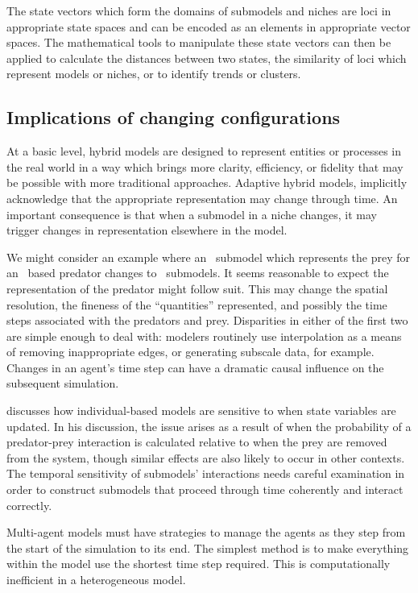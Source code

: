 The state vectors which form the domains of sub\-models and niches are
loci in appropriate state spaces and can be encoded as an elements in
appropriate vector spaces. The math\-e\-mat\-i\-cal tools to manipulate these
state vectors can then be applied to calculate the distances between
two states, the similarity of loci which represent models or niches,
or to identify trends or clusters.



\subsection{Implications of changing con\-fig\-ur\-a\-tions}

At a basic level, hybrid models are designed to represent entities or
processes in the real world in a way which brings more clarity,
efficiency, or fidelity that may be possible with more traditional
approaches. Adaptive hybrid models, implicitly acknowledge that the
appropriate rep\-re\-sen\-ta\-tion may change through time. An important
consequence is that when a sub\-model in a niche changes, it may trigger
changes in rep\-re\-sen\-ta\-tion elsewhere in the model.

We might consider an example where an \SD\ sub\-model which represents
the prey for an \SD\ based predator changes to \IB\ sub\-models. It
seems reasonable to expect the rep\-re\-sen\-ta\-tion of the predator might
follow suit. This may change the spatial resolution, the fineness of
the ``quantities'' represented, and possibly the time steps associated
with the predators and prey. Disparities in either of the first two
are simple enough to deal with: modelers routinely use interpolation
as a means of removing inappropriate edges, or generating subscale
data, for example.  Changes in an agent's time step can have a
dramatic causal influence on the subsequent simulation.

\Cite{chivers2009generalised} discusses how in\-di\-vidu\-al-based models
are sen\-si\-tive to when state variables are updated.  In his discussion,
the issue arises as a result of when the probability of a
predator-prey in\-ter\-ac\-tion is cal\-cu\-la\-ted relative to when the prey are
re\-moved from the system, though sim\-i\-lar effects are also likely to
oc\-cur in other con\-texts. The temporal sen\-si\-tiv\-i\-ty of sub\-models'
interactions needs careful examination in order to construct sub\-models
that proceed through time coherently and interact correctly.

Multi-agent models must have strategies to manage the agents as they
step from the start of the simulation to its end.  The simplest method
is to make everything within the model use the shortest time step
required.  This is computationally inefficient in a heterogeneous
model.


